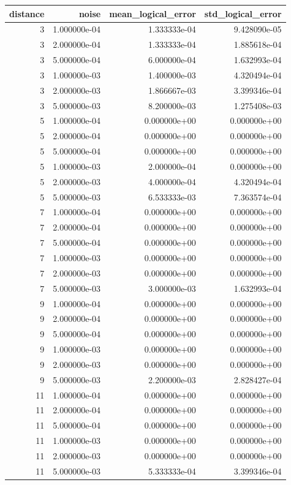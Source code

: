 \begin{tabular}{rrrr}
\toprule
distance & noise & mean_logical_error & std_logical_error \\
\midrule
3 & 1.000000e-04 & 1.333333e-04 & 9.428090e-05 \\
3 & 2.000000e-04 & 1.333333e-04 & 1.885618e-04 \\
3 & 5.000000e-04 & 6.000000e-04 & 1.632993e-04 \\
3 & 1.000000e-03 & 1.400000e-03 & 4.320494e-04 \\
3 & 2.000000e-03 & 1.866667e-03 & 3.399346e-04 \\
3 & 5.000000e-03 & 8.200000e-03 & 1.275408e-03 \\
5 & 1.000000e-04 & 0.000000e+00 & 0.000000e+00 \\
5 & 2.000000e-04 & 0.000000e+00 & 0.000000e+00 \\
5 & 5.000000e-04 & 0.000000e+00 & 0.000000e+00 \\
5 & 1.000000e-03 & 2.000000e-04 & 0.000000e+00 \\
5 & 2.000000e-03 & 4.000000e-04 & 4.320494e-04 \\
5 & 5.000000e-03 & 6.533333e-03 & 7.363574e-04 \\
7 & 1.000000e-04 & 0.000000e+00 & 0.000000e+00 \\
7 & 2.000000e-04 & 0.000000e+00 & 0.000000e+00 \\
7 & 5.000000e-04 & 0.000000e+00 & 0.000000e+00 \\
7 & 1.000000e-03 & 0.000000e+00 & 0.000000e+00 \\
7 & 2.000000e-03 & 0.000000e+00 & 0.000000e+00 \\
7 & 5.000000e-03 & 3.000000e-03 & 1.632993e-04 \\
9 & 1.000000e-04 & 0.000000e+00 & 0.000000e+00 \\
9 & 2.000000e-04 & 0.000000e+00 & 0.000000e+00 \\
9 & 5.000000e-04 & 0.000000e+00 & 0.000000e+00 \\
9 & 1.000000e-03 & 0.000000e+00 & 0.000000e+00 \\
9 & 2.000000e-03 & 0.000000e+00 & 0.000000e+00 \\
9 & 5.000000e-03 & 2.200000e-03 & 2.828427e-04 \\
11 & 1.000000e-04 & 0.000000e+00 & 0.000000e+00 \\
11 & 2.000000e-04 & 0.000000e+00 & 0.000000e+00 \\
11 & 5.000000e-04 & 0.000000e+00 & 0.000000e+00 \\
11 & 1.000000e-03 & 0.000000e+00 & 0.000000e+00 \\
11 & 2.000000e-03 & 0.000000e+00 & 0.000000e+00 \\
11 & 5.000000e-03 & 5.333333e-04 & 3.399346e-04 \\
\bottomrule
\end{tabular}
